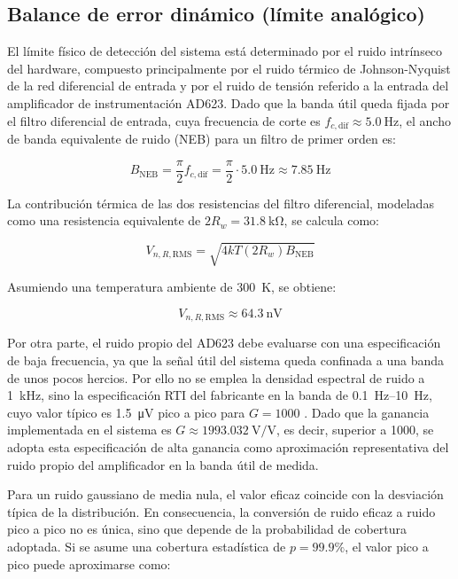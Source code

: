 \subsection{Balance de error dinámico (límite analógico)}

El límite físico de detección del sistema está determinado por el ruido intrínseco del hardware, compuesto principalmente por el ruido térmico de Johnson-Nyquist de la red diferencial de entrada y por el ruido de tensión referido a la entrada del amplificador de instrumentación AD623. Dado que la banda útil queda fijada por el filtro diferencial de entrada, cuya frecuencia de corte es $f_{c,\mathrm{dif}} \approx \SI{5.0}{\Hz}$, el ancho de banda equivalente de ruido (NEB) para un filtro de primer orden es:

\[
    B_{\mathrm{NEB}} = \frac{\pi}{2} f_{c,\mathrm{dif}}
    = \frac{\pi}{2} \cdot \SI{5.0}{\Hz}
    \approx \SI{7.85}{\Hz}
\]

La contribución térmica de las dos resistencias del filtro diferencial, modeladas como una resistencia equivalente de $2R_w = \SI{31.8}{\kilo\ohm}$, se calcula como:

\[
    V_{n,R,\mathrm{RMS}} = \sqrt{4kT(2R_w)B_{\mathrm{NEB}}}
\]

Asumiendo una temperatura ambiente de \SI{300}{\kelvin}, se obtiene:

\[
    V_{n,R,\mathrm{RMS}} \approx \SI{64.3}{\nano\V}
\]

Por otra parte, el ruido propio del AD623 debe evaluarse con una especificación de baja frecuencia, ya que la señal útil del sistema queda confinada a una banda de unos pocos hercios. Por ello no se emplea la densidad espectral de ruido a \SI{1}{\kilo\Hz}, sino la especificación RTI del fabricante en la banda de \SIrange{0.1}{10}{\Hz}, cuyo valor típico es \SI{1.5}{\micro\V} pico a pico para $G=1000$ \cite{ad623_datasheet}. Dado que la ganancia implementada en el sistema es $G \approx \SI{1993.032}{\V\per\V}$, es decir, superior a \num{1000}, se adopta esta especificación de alta ganancia como aproximación representativa del ruido propio del amplificador en la banda útil de medida.

Para un ruido gaussiano de media nula, el valor eficaz coincide con la desviación típica de la distribución. En consecuencia, la conversión de ruido eficaz a ruido pico a pico no es única, sino que depende de la probabilidad de cobertura adoptada. Si se asume una cobertura estadística de $p=99.9\%$, el valor pico a pico puede aproximarse como:

